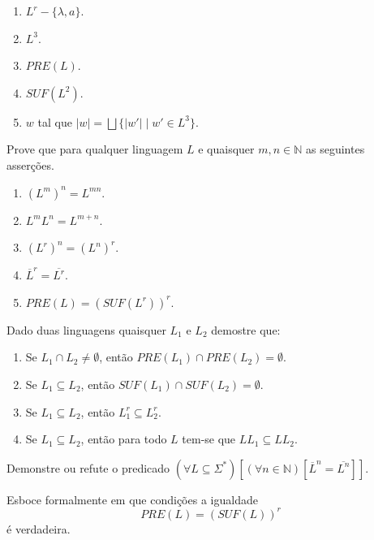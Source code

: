 \begin{enumerate}
	\item $L^r - \{\lambda, a\}$.
	\item $L^3$.
	\item $PRE(L)$.
	\item $SUF(L^2)$.
	\item $w$ tal que $|w| = \bigsqcup \{|w'| \mid w' \in L^3\}$.
\end{enumerate}

\begin{exercise}\label{exerc:LR4}
	Prove que para qualquer linguagem $L$ e quaisquer $m,n \in \mathbb{N}$ as seguintes asserções.
\end{exercise}

\begin{enumerate}
	\item $(L^m)^n = L^{mn}$.
	\item $L^mL^n = L^{m+n}$.
	\item $(L^r)^n = (L^n)^r$.
	\item $\overline{L}^r = \overline{L^r}$.
	\item $PRE(L) = (SUF(L^r))^r$.
\end{enumerate}

\begin{exercise}\label{exerc:LR5}
	Dado duas linguagens quaisquer $L_1$ e $L_2$ demostre que:
\end{exercise}

\begin{enumerate}
	\item Se $L_1 \cap L_2 \neq \emptyset$, então $PRE(L_1) \cap PRE(L_2) = \emptyset$.
	\item Se $L_1 \subseteq L_2$, então $SUF(L_1) \cap SUF(L_2) = \emptyset$.
	\item Se $L_1 \subseteq L_2$, então $L_1^r \subseteq L_2^r$.
	\item Se $L_1 \subseteq L_2$, então para todo $L$ tem-se que $LL_1 \subseteq LL_2$. 
\end{enumerate}

\begin{exercise}\label{exerc:LR6}
	Demonstre ou refute o predicado $(\forall L \subseteq \Sigma^*)[(\forall n \in \mathbb{N})[\overline{L}^n = \overline{L^n}]]$.
\end{exercise}

\begin{exercise}\label{exerc:LR7}
	Esboce formalmente em que condições a igualdade 
	$$PRE(L) = (SUF(L))^r$$ 
	é verdadeira.
\end{exercise}
